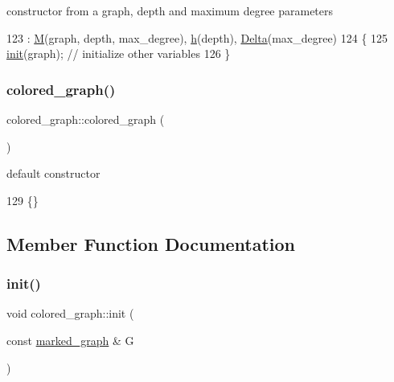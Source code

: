 constructor from a graph, depth and maximum degree parameters 


\begin{DoxyCode}
123                                                                     : \hyperlink{classcolored__graph_ab72c568fe12f7c849ca6bffb145aec47}{M}(graph, depth, max\_degree), 
      \hyperlink{classcolored__graph_ae27062a4ee59df2670d3a0c81e85a3fa}{h}(depth), \hyperlink{classcolored__graph_a5b0e93eb40a20dc815c809dee11edc12}{Delta}(max\_degree)
124   \{
125     \hyperlink{classcolored__graph_a0e867afa9f5491dfc05bed10680f0709}{init}(graph); \textcolor{comment}{// initialize other variables }
126   \}
\end{DoxyCode}
\mbox{\label{classcolored__graph_a104bcd930e68c04e4786678923bfdca1}} 
\subsubsection{\texorpdfstring{colored\+\_\+graph()}{colored\_graph()}\hspace{0.1cm}{\footnotesize\ttfamily [2/2]}}
{\footnotesize\ttfamily colored\+\_\+graph\+::colored\+\_\+graph (\begin{DoxyParamCaption}{ }\end{DoxyParamCaption})\hspace{0.3cm}{\ttfamily [inline]}}



default constructor 


\begin{DoxyCode}
129 \{\}
\end{DoxyCode}


\subsection{Member Function Documentation}
\mbox{\label{classcolored__graph_a0e867afa9f5491dfc05bed10680f0709}} 
\subsubsection{\texorpdfstring{init()}{init()}}
{\footnotesize\ttfamily void colored\+\_\+graph\+::init (\begin{DoxyParamCaption}\item[{const \hyperlink{classmarked__graph}{marked\+\_\+graph} \&}]{G }\end{DoxyParamCaption})}



